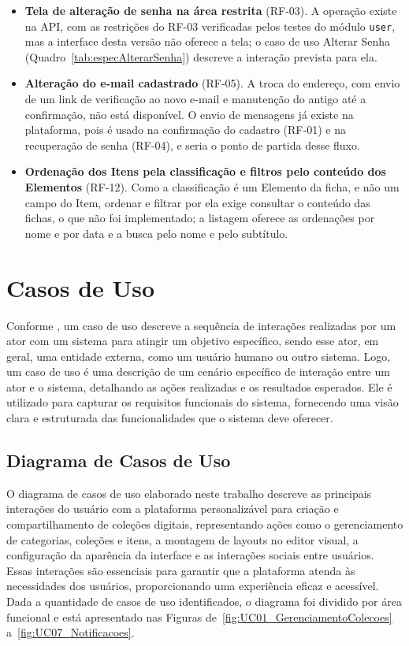 \begin{itemize}
\item \textbf{Tela de alteração de senha na área restrita} (RF-03). A operação existe na API, com
as restrições do RF-03 verificadas pelos testes do módulo \texttt{user}, mas a interface desta
versão não oferece a tela; o caso de uso Alterar Senha (Quadro~\ref{tab:especAlterarSenha})
descreve a interação prevista para ela.
\item \textbf{Alteração do e-mail cadastrado} (RF-05). A troca do endereço, com envio de um link
de verificação ao novo e-mail e manutenção do antigo até a confirmação, não está disponível. O
envio de mensagens já existe na plataforma, pois é usado na confirmação do cadastro (RF-01) e na
recuperação de senha (RF-04), e seria o ponto de partida desse fluxo.
\item \textbf{Ordenação dos Itens pela classificação e filtros pelo conteúdo dos Elementos}
(RF-12). Como a classificação é um Elemento da ficha, e não um campo do Item, ordenar e filtrar
por ela exige consultar o conteúdo das fichas, o que não foi implementado; a listagem oferece as
ordenações por nome e por data e a busca pelo nome e pelo subtítulo.
\end{itemize}


\section{Casos de Uso}
Conforme , um caso de uso descreve a sequência de interações realizadas por um ator com um sistema para atingir um objetivo específico, 
sendo esse ator, em geral, uma entidade externa, como um usuário humano ou outro sistema. 
Logo, um caso de uso é uma descrição de um cenário específico de interação entre um ator e o sistema, detalhando as ações realizadas e os resultados esperados. 
Ele é utilizado para capturar os requisitos funcionais do sistema, fornecendo uma visão clara e estruturada das funcionalidades que o sistema deve oferecer.

\subsection{Diagrama de Casos de Uso}
O diagrama de casos de uso elaborado neste trabalho descreve as principais interações do usuário com a plataforma personalizável para criação e compartilhamento de coleções digitais,
representando ações como o gerenciamento de categorias, coleções e itens, a montagem de layouts no editor visual, a configuração da aparência da interface e as interações sociais
entre usuários. Essas interações são essenciais para garantir que a plataforma atenda às necessidades dos usuários, proporcionando uma experiência eficaz e acessível.
Dada a quantidade de casos de uso identificados, o diagrama foi dividido por área funcional e está apresentado nas Figuras de~\ref{fig:UC01_GerenciamentoColecoes} a~\ref{fig:UC07_Notificacoes}.

